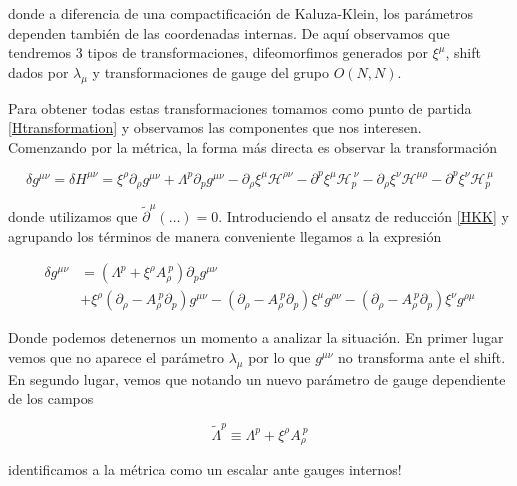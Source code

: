 \documentclass{article}
\numberwithin{equation}{section}
\begin{document}
donde a diferencia de una compactificación de Kaluza-Klein, los parámetros dependen también de las coordenadas internas. De aquí observamos que tendremos 3 tipos de transformaciones, difeomorfimos generados por $ \xi^{\mu}  $, shift dados por $ \lambda_{\mu} $ y transformaciones de gauge del grupo $ O(N,N) $. 

Para obtener todas estas transformaciones tomamos como punto de partida \ref{Htransformation} y observamos las componentes que nos interesen.\\


Comenzando por la métrica, la forma más directa es observar la transformación

\begin{equation}
\delta g^{\mu \nu} = \delta H^{\mu \nu} = \xi^{\rho} \partial_{\rho} g^{\mu \nu}  + \Lambda^p \partial_p g^{\mu \nu} - \partial_{\rho} \xi^{\mu} \mathcal{H}^{\rho \nu} - \partial^p \xi^{\mu} \mathcal{H}_{p}^{\ \nu} - \partial_{\rho} \xi^{\nu} \mathcal{H}^{\mu \rho} - \partial^p \xi^{\nu} \mathcal{H}_{p}^{\ \mu}
\end{equation}

donde utilizamos que $ \widetilde{\partial}^{\mu} \left( \dots \right)  = 0$. Introduciendo el ansatz de reducción \ref{HKK} y agrupando los términos de manera conveniente llegamos a la expresión

\begin{equation}
\begin{aligned}
\delta g^{\mu \nu} &=  \left( \Lambda^p + \xi^{\rho} A_{\rho}^{\ p}\right)\partial_p g^{\mu \nu}\\
& + \xi^{\rho} \left( \partial_{\rho} - A_{\rho}^{\ p} \partial_p \right) g^{\mu \nu} - \left( \partial_{\rho} - A_{\rho}^{\ p} \partial_p \right) \xi^{\mu} g^{\rho \nu}  - \left( \partial_{\rho} - A_{\rho}^{\ p} \partial_p \right) \xi^{\nu} g^{\rho \mu}
\end{aligned}
\end{equation}

Donde podemos detenernos un momento a analizar la situación. En primer lugar vemos que no aparece el parámetro $ \lambda_{\mu} $ por lo que $ g^{\mu \nu} $ no transforma ante el shift. En segundo lugar, vemos que notando un nuevo parámetro de gauge dependiente de los campos

\begin{equation}
\widetilde{\Lambda}^{p} \equiv \Lambda^p + \xi^{\rho} A_{\rho}^{\ p}
\end{equation}

identificamos a la métrica como un escalar ante gauges internos!
\end{document}
